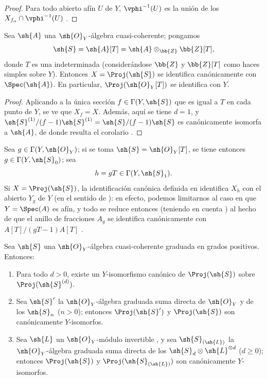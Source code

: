 \documentclass[oneside,10pt]{amsart}
\renewcommand{\geq}{\geqslant}
\newcommand{\oldpage}[2][]{\marginnote{\normalfont\footnotesize\textbf{#1}~|~#2}\ignorespaces}
\let\EGAOriginalLabel\label
\renewcommand{\label}[1]{\phantomsection\EGAOriginalLabel{#1}}
\begin{document}
\begin{proof}
Para todo abierto afín $U$ de $Y$, $\vphi^{-1}(U)$ es la unión de los $X_{f_\alpha}\cap\vphi^{-1}(U)$ .
\end{proof}

\begin{corollary}[3.1.7]
\label{II.3.1.7}
Sea $\sh{A}$ una $\sh{O}_Y$-álgebra cuasi-coherente; pongamos
\[
  \sh{S}=\sh{A}[T]=\sh{A}\otimes_{\bb{Z}}\bb{Z}[T],
\]
donde $T$ es una indeterminada (considerándose $\bb{Z}$ y $\bb{Z}[T]$ como haces simples sobre $Y$).
Entonces $X=\Proj(\sh{S})$ se identifica canónicamente con $\Spec(\sh{A})$.
En particular, $\Proj(\sh{O}_Y[T])$ se identifica con $Y$.
\end{corollary}

\begin{proof}
Aplicando  a la única sección $f\in\Gamma(Y,\sh{S})$ que es igual a $T$ en cada punto de $Y$, se ve que $X_f=X$.
Además, aquí se tiene $d=1$, y $\sh{S}^{(1)}/(f-1)\sh{S}^{(1)}=\sh{S}/(f-1)\sh{S}$ es canónicamente isomorfa a $\sh{A}$, de donde resulta el corolario .
\end{proof}

Sea $g\in\Gamma(Y,\sh{O}_Y)$; si se toma $\sh{S}=\sh{O}_Y[T]$, se tiene entonces $g\in\Gamma(Y,\sh{S}_0)$; sea
\[
  h=gT\in\Gamma(Y,\sh{S}_1).
\]
Si $X=\Proj(\sh{S})$, la identificación canónica definida en  identifica $X_h$ con el abierto $Y_g$ de $Y$ (en el sentido de ): en efecto, podemos limitarnos al caso en que $Y=\Spec(A)$ es afín, y todo se reduce entonces (teniendo en cuenta ) al hecho de que el anillo de fracciones $A_g$ se identifica canónicamente con $A[T]/(gT-1)A[T]$ .

\begin{proposition}[3.1.8]
\label{II.3.1.8}
Sea $\sh{S}$ una $\sh{O}_Y$-álgebra cuasi-coherente graduada en grados positivos.
Entonces:
\begin{enumerate}
  \item[(i)] Para todo $d>0$, existe un $Y$-isomorfismo canónico de $\Proj(\sh{S})$ sobre $\Proj(\sh{S}^{(d)})$.
\oldpage[II]{52}
  \item[(ii)] Sea $\sh{S}'$ la $\sh{O}_Y$-álgebra graduada suma directa de $\sh{O}_Y$ y de los $\sh{S}_n$ ($n>0$); entonces $\Proj(\sh{S}')$ y $\Proj(\sh{S})$ son canónicamente $Y$-isomorfos.
  \item[(iii)] Sea $\sh{L}$ un $\sh{O}_Y$-módulo invertible , y sea $\sh{S}_{(\sh{L})}$ la $\sh{O}_Y$-álgebra graduada suma directa de los $\sh{S}_d\otimes\sh{L}^{\otimes d}$ ($d\geq0$); entonces $\Proj(\sh{S})$ y $\Proj(\sh{S}_{(\sh{L})})$ son canónicamente $Y$-isomorfos.
\end{enumerate}
\end{proposition}
\end{document}
